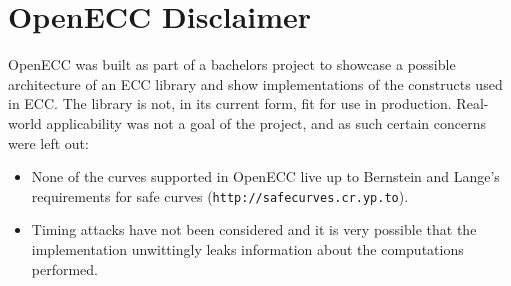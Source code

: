 \section{OpenECC Disclaimer}
\label{app:disclaimer}

OpenECC was built as part of a bachelors project to showcase a possible architecture of an ECC library and
show implementations of the constructs used in ECC. The library is not, in its current form, fit for use in
production. Real-world applicability was not a goal of the project, and as such certain concerns were left out:

\begin{itemize}
    \item None of the curves supported in OpenECC live up to Bernstein and Lange's requirements for safe curves
        (\texttt{http://safecurves.cr.yp.to}).
    \item Timing attacks have not been considered and it is very possible that the implementation unwittingly
        leaks information about the computations performed.
\end{itemize}